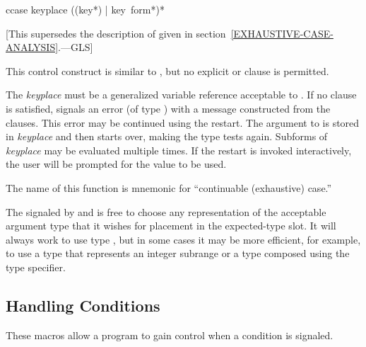 \begin{defmac}
ccase keyplace {({({key}*) | key} {\,form}*)}*

   [This supersedes the description of 
   given in section~\ref{EXHAUSTIVE-CASE-ANALYSIS}.---GLS]

  This control construct is similar to , but no explicit  or
   clause is permitted.

  The \emph{keyplace} must be a generalized variable reference acceptable to .
  If no clause is satisfied,  signals an error (of type )
  with a message constructed from the clauses. This error may be continued
  using the  restart. The argument to  is stored in
  \emph{keyplace} and then  starts over, making the type tests again. Subforms
  of \emph{keyplace} may be evaluated multiple times. If the  restart is
  invoked interactively, the user will be prompted for the value to be used.

  The name of this function is mnemonic for ``continuable (exhaustive) case.''

\beforenoterule
\begin{implementation}
  The  signaled by  and  is free to
  choose any representation of the acceptable argument type that it wishes
  for placement in the expected-type slot. It will always work to use type
  , but in some cases it may be more efficient, for example,
  to use a type that represents an integer subrange or a type composed using the
   type specifier.
\end{implementation}
\afternoterule
\end{defmac}


\subsection{Handling Conditions}

These macros allow a program to gain control when a condition is signaled.

